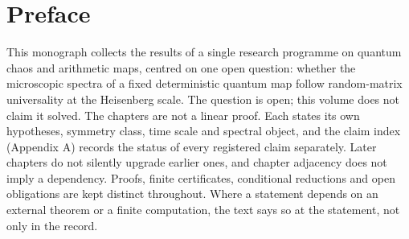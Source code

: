 \section*{Preface}
This monograph collects the results of a single research programme on
quantum chaos and arithmetic maps, centred on one open question: whether
the microscopic spectra of a fixed deterministic quantum map follow
random-matrix universality at the Heisenberg scale. The question is open;
this volume does not claim it solved.
The chapters are not a linear proof. Each states its own hypotheses,
symmetry class, time scale and spectral object, and the claim index
(Appendix A) records the status of every registered claim separately.
Later chapters do not silently upgrade earlier ones, and chapter
adjacency does not imply a dependency.
Proofs, finite certificates, conditional reductions and open
obligations are kept distinct throughout. Where a statement depends on
an external theorem or a finite computation, the text says so at the
statement, not only in the record.
